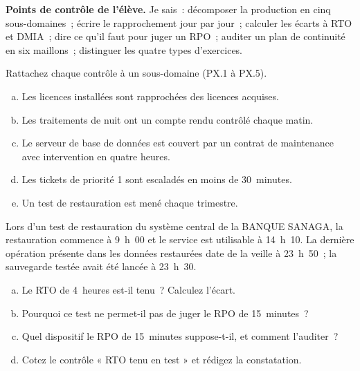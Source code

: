 \begin{boxinfo}
\textbf{Points de contrôle de l'élève.} Je sais~: décomposer la production
en cinq sous-domaines~; écrire le rapprochement jour par jour~; calculer
les écarts à RTO et DMIA~; dire ce qu'il faut pour juger un RPO~; auditer un
plan de continuité en six maillons~; distinguer les quatre types
d'exercices.
\end{boxinfo}

\bigskip

\begin{boxexo}[title={\ding{45}\quad Exercice~23.1. Rattacher les contrôles \niveaubase}]
Rattachez chaque contrôle à un sous-domaine (PX.1 à PX.5).
\begin{enumerate}[(a)]
    \item Les licences installées sont rapprochées des licences acquises.
    \item Les traitements de nuit ont un compte rendu contrôlé chaque matin.
    \item Le serveur de base de données est couvert par un contrat de
          maintenance avec intervention en quatre heures.
    \item Les tickets de priorité 1 sont escaladés en moins de 30~minutes.
    \item Un test de restauration est mené chaque trimestre.
\end{enumerate}
\end{boxexo}

\begin{boxexo}[title={\ding{45}\quad Exercice~23.2. RTO et RPO \niveaumoyen}]
Lors d'un test de restauration du système central de la BANQUE SANAGA, la
restauration commence à 9~h~00 et le service est utilisable à 14~h~10. La
dernière opération présente dans les données restaurées date de la veille
à 23~h~50~; la sauvegarde testée avait été lancée à 23~h~30.
\begin{enumerate}[(a)]
    \item Le RTO de 4~heures est-il tenu~? Calculez l'écart.
    \item Pourquoi ce test ne permet-il pas de juger le RPO de
          15~minutes~?
    \item Quel dispositif le RPO de 15~minutes suppose-t-il, et comment
          l'auditer~?
    \item Cotez le contrôle « RTO tenu en test » et rédigez la
          constatation.
\end{enumerate}
\end{boxexo}

